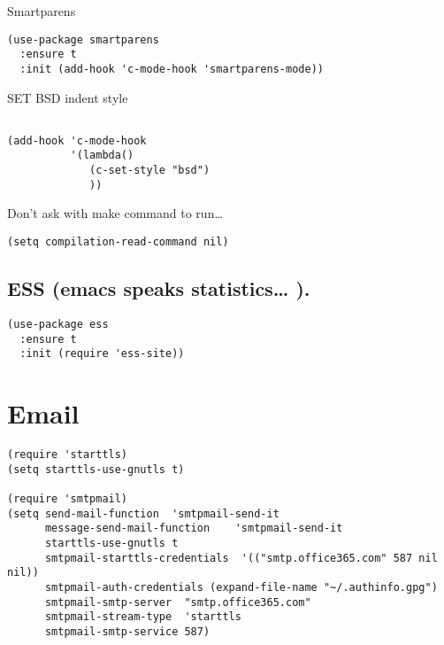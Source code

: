 \documentclass[12pt]{article}
\begin{document}
Smartparens

\lstset{language=Lisp,label= ,caption= ,captionpos=b,numbers=none}
\begin{lstlisting}
(use-package smartparens
  :ensure t
  :init (add-hook 'c-mode-hook 'smartparens-mode))
\end{lstlisting}

SET BSD indent style

\lstset{language=Lisp,label= ,caption= ,captionpos=b,numbers=none}
\begin{lstlisting}

(add-hook 'c-mode-hook
          '(lambda()
             (c-set-style "bsd")
             ))
\end{lstlisting}
Don't ask with make command to run\ldots{}

\lstset{language=Lisp,label= ,caption= ,captionpos=b,numbers=none}
\begin{lstlisting}
(setq compilation-read-command nil)
\end{lstlisting}

\subsection{ESS (emacs speaks statistics\ldots{} ).}
\label{sec:org20a1119}

\lstset{language=Lisp,label= ,caption= ,captionpos=b,numbers=none}
\begin{lstlisting}
(use-package ess
  :ensure t
  :init (require 'ess-site))
\end{lstlisting}

\section{Email}
\label{sec:orgc505fc9}


\lstset{language=Lisp,label= ,caption= ,captionpos=b,numbers=none}
\begin{lstlisting}
(require 'starttls)
(setq starttls-use-gnutls t)

(require 'smtpmail)
(setq send-mail-function  'smtpmail-send-it
      message-send-mail-function    'smtpmail-send-it
      starttls-use-gnutls t
      smtpmail-starttls-credentials  '(("smtp.office365.com" 587 nil nil))
      smtpmail-auth-credentials (expand-file-name "~/.authinfo.gpg")
      smtpmail-smtp-server  "smtp.office365.com"
      smtpmail-stream-type  'starttls
      smtpmail-smtp-service 587)

\end{lstlisting}
\end{document}
